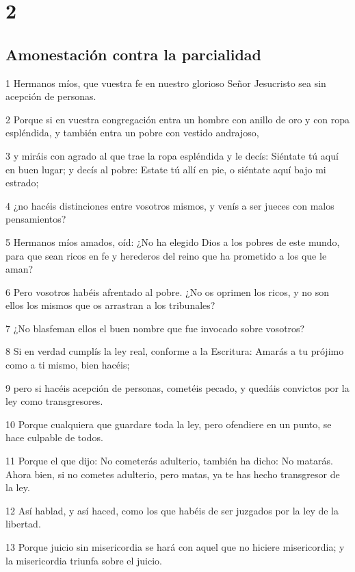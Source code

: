 \chapter{2}

\section*{Amonestación contra la parcialidad}

\par 1 Hermanos míos, que vuestra fe en nuestro glorioso Señor Jesucristo sea sin acepción de personas.
\par 2 Porque si en vuestra congregación entra un hombre con anillo de oro y con ropa espléndida, y también entra un pobre con vestido andrajoso,
\par 3 y miráis con agrado al que trae la ropa espléndida y le decís: Siéntate tú aquí en buen lugar; y decís al pobre: Estate tú allí en pie, o siéntate aquí bajo mi estrado;
\par 4 ¿no hacéis distinciones entre vosotros mismos, y venís a ser jueces con malos pensamientos?
\par 5 Hermanos míos amados, oíd: ¿No ha elegido Dios a los pobres de este mundo, para que sean ricos en fe y herederos del reino que ha prometido a los que le aman?
\par 6 Pero vosotros habéis afrentado al pobre. ¿No os oprimen los ricos, y no son ellos los mismos que os arrastran a los tribunales?
\par 7 ¿No blasfeman ellos el buen nombre que fue invocado sobre vosotros?
\par 8 Si en verdad cumplís la ley real, conforme a la Escritura: Amarás a tu prójimo como a ti mismo, bien hacéis;
\par 9 pero si hacéis acepción de personas, cometéis pecado, y quedáis convictos por la ley como transgresores.
\par 10 Porque cualquiera que guardare toda la ley, pero ofendiere en un punto, se hace culpable de todos.
\par 11 Porque el que dijo: No cometerás adulterio, también ha dicho: No matarás. Ahora bien, si no cometes adulterio, pero matas, ya te has hecho transgresor de la ley.
\par 12 Así hablad, y así haced, como los que habéis de ser juzgados por la ley de la libertad.
\par 13 Porque juicio sin misericordia se hará con aquel que no hiciere misericordia; y la misericordia triunfa sobre el juicio.

